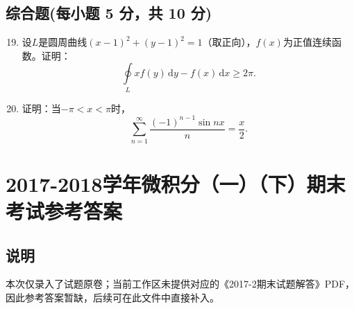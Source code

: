 \documentclass[../Main.tex]{subfiles}
\begin{document}
\section{综合题(每小题 5 分，共 10 分)}
\begin{enumerate}
    \setcounter{enumi}{18}
    \item 设$L$是圆周曲线$(x-1)^{2}+(y-1)^{2}=1$（取正向），$f(x)$为正值连续函数。证明：
          \[
              \oint\limits_{L}xf(y)\,\mathrm{d}y-f(x)\,\mathrm{d}x\geq2\pi.
          \]
          \vspace{15em}

    \item 证明：当$-\pi<x<\pi$时，
          \[
              \sum_{n=1}^{\infty}\frac{(-1)^{n-1}\sin nx}{n}=\frac{x}{2}.
          \]
          \vspace{15em}
\end{enumerate}

\chapter{2017-2018学年微积分（一）（下）期末考试参考答案}
\section{说明}

本次仅录入了试题原卷；当前工作区未提供对应的《2017-2期末试题解答》PDF，因此参考答案暂缺，后续可在此文件中直接补入。
\end{document}
